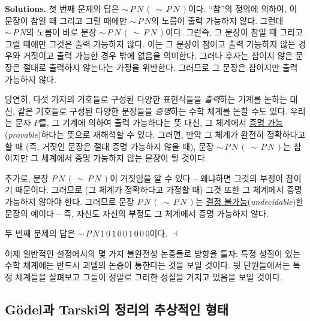\documentclass[12pt]{paper}
\newenvironment{context}[1][]{\noindent \textbf{{#1}.}}{\hfill $ \dashv $}
\begin{document}
  \begin{context}[Solutions]
    첫 번째 문제의 답은 $ \sim \, P \, N \, \left( \, \sim \, P \, N \, \right) $이다.
    ``참''의 정의에 의하여, 이 문장이 참일 때 그리고 그럴 때에만 $ \sim \, P \, N $의 노름이 출력 가능하지 않다.
    그런데 $ \sim \, P \, N $의 노름이 바로 문장 $ \sim \, P \, N \, \left( \, \sim \, P \, N \, \right) $이다.
    그런즉, 그 문장이 참일 때 그리고 그럴 때에만 그것은 출력 가능하지 않다.
    이는 그 문장이 참이고 출력 가능하지 않는 경우와 거짓이고 출력 가능한 경우 밖에 없음을 의미한다.
    그러나 후자는 참이지 않은 문장은 절대로 출력하지 않는다는 가정을 위반한다.
    그러므로 그 문장은 참이지만 출력 가능하지 않다.

    당연히, 다섯 가지의 기호들로 구성된 다양한 표현식들을 \textit{출력}하는 기계를 논하는 대신,
    같은 기호들로 구성된 다양한 문장들을 \textit{증명}하는 수학 체계를 논할 수도 있다.
    우리는 문자 $P$를, 그 기계에 의하여 출력 가능하다는 뜻 대신, 그 체계에서 \underline{증명 가능}(\textit{provable})하다는 뜻으로 재해석할 수 있다.
    그러면, 만약 그 체계가 완전히 정확하다고 할 때 (즉, 거짓인 문장은 절대 증명 가능하지 않을 때),
    문장 $ \sim \, P \, N \, \left( \, \sim \, P \, N \, \right) $는 참이지만 그 체계에서 증명 가능하지 않는 문장이 될 것이다.

    추가로, 문장 $ P \, N \, \left( \, \sim \, P \, N \, \right) $이 거짓임을 알 수 있다 --
    왜냐하면 그것의 부정이 참이기 때문이다.
    그러므로 (그 체계가 정확하다고 가정할 때) 그것 또한 그 체계에서 증명 가능하지 않아야 한다.
    그러므로 문장 $ P \, N \, \left( \, \sim \, P \, N \, \right) $는 \underline{결정 불가능}(\textit{undecidable})한 문장의 예이다 --
    즉, 자신도 자신의 부정도 그 체계에서 증명 가능하지 않다.
    
    두 번째 문제의 답은 $ \sim \, P \, N \, 1 \, 0 \, 1 \, 0 \, 0 \, 1 \, 0 \, 0 \, 0 $이다.
  \end{context}

  이제 일반적인 설정에서의 몇 가지 불완전성 논증들로 방향을 틀자:
  특정 성질이 있는 수학 체계에는 반드시 괴델의 논증이 통한다는 것을 보일 것이다.
  뒷 단원들에서는 특정 체계들을 살펴보고 그들이 정말로 그러한 성질을 가지고 있음을 보일 것이다.

  \subsection{G\"odel과 Tarski의 정리의 추상적인 형태}
  \hspace{12pt}
\end{document}
